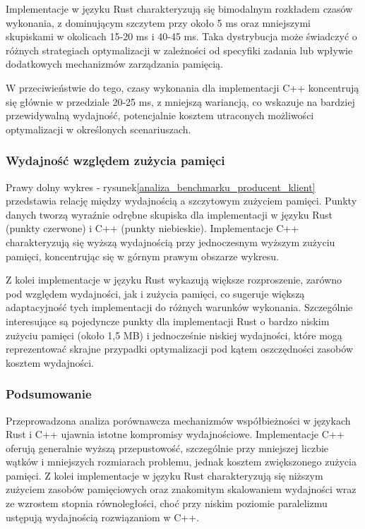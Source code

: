 Implementacje w języku Rust charakteryzują się bimodalnym rozkładem czasów wykonania, z dominującym szczytem przy około 5 ms oraz mniejszymi skupiskami w okolicach 15-20 ms i 40-45 ms. Taka dystrybucja może świadczyć o różnych strategiach optymalizacji w zależności od specyfiki zadania lub wpływie dodatkowych mechanizmów zarządzania pamięcią.

W przeciwieństwie do tego, czasy wykonania dla implementacji C++ koncentrują się głównie w przedziale 20-25 ms, z mniejszą wariancją, co wskazuje na bardziej przewidywalną wydajność, potencjalnie kosztem utraconych możliwości optymalizacji w określonych scenariuszach.

\subsubsection{Wydajność względem zużycia pamięci}
Prawy dolny wykres - rysunek\ref{analiza_benchmarku_producent_klient} przedstawia relację między wydajnością a szczytowym zużyciem pamięci. Punkty danych tworzą wyraźnie odrębne skupiska dla implementacji w języku Rust (punkty czerwone) i C++ (punkty niebieskie). Implementacje C++ charakteryzują się wyższą wydajnością przy jednoczesnym wyższym zużyciu pamięci, koncentrując się w górnym prawym obszarze wykresu.

Z kolei implementacje w języku Rust wykazują większe rozproszenie, zarówno pod względem wydajności, jak i zużycia pamięci, co sugeruje większą adaptacyjność tych implementacji do różnych warunków wykonania. Szczególnie interesujące są pojedyncze punkty dla implementacji Rust o bardzo niskim zużyciu pamięci (około 1,5 MB) i jednocześnie niskiej wydajności, które mogą reprezentować skrajne przypadki optymalizacji pod kątem oszczędności zasobów kosztem wydajności.

\subsubsection{Podsumowanie}
Przeprowadzona analiza porównawcza mechanizmów współbieżności w językach Rust i C++ ujawnia istotne kompromisy wydajnościowe. Implementacje C++ oferują generalnie wyższą przepustowość, szczególnie przy mniejszej liczbie wątków i mniejszych rozmiarach problemu, jednak kosztem zwiększonego zużycia pamięci. Z kolei implementacje w języku Rust charakteryzują się niższym zużyciem zasobów pamięciowych oraz znakomitym skalowaniem wydajności wraz ze wzrostem stopnia równoległości, choć przy niskim poziomie paralelizmu ustępują wydajnością rozwiązaniom w C++.

